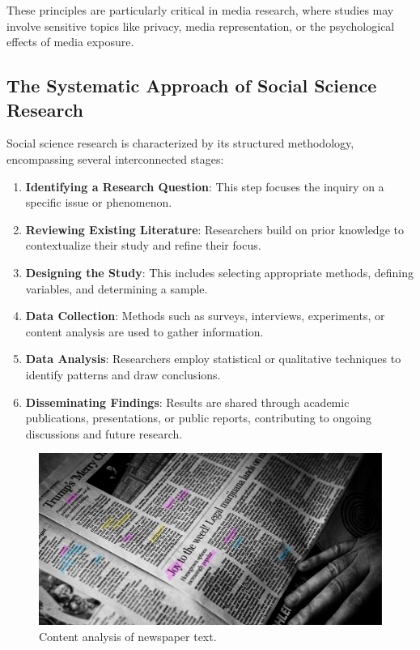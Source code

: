 \documentclass[
]{book}
\providecommand{\tightlist}{%
  \setlength{\itemsep}{0pt}\setlength{\parskip}{0pt}}
\begin{document}
These principles are particularly critical in media research, where studies may involve sensitive topics like privacy, media representation, or the psychological effects of media exposure.

\subsection*{The Systematic Approach of Social Science Research}\label{the-systematic-approach-of-social-science-research}

Social science research is characterized by its structured methodology, encompassing several interconnected stages:

\begin{enumerate}
\def\labelenumi{\arabic{enumi}.}
\tightlist
\item
  \textbf{Identifying a Research Question}: This step focuses the inquiry on a specific issue or phenomenon.
\item
  \textbf{Reviewing Existing Literature}: Researchers build on prior knowledge to contextualize their study and refine their focus.
\item
  \textbf{Designing the Study}: This includes selecting appropriate methods, defining variables, and determining a sample.
\item
  \textbf{Data Collection}: Methods such as surveys, interviews, experiments, or content analysis are used to gather information.
\item
  \textbf{Data Analysis}: Researchers employ statistical or qualitative techniques to identify patterns and draw conclusions.
\item
  \textbf{Disseminating Findings}: Results are shared through academic publications, presentations, or public reports, contributing to ongoing discussions and future research.
\end{enumerate}

\begin{figure}
\centering
\includegraphics[width=1\linewidth,height=\textheight,keepaspectratio]{images/newspaper_content.jpg}
\caption{Content analysis of newspaper text.}
\end{figure}
\end{document}

